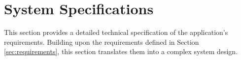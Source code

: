 \section{System Specifications}

This section provides a detailed technical specification of the application's requirements. Building upon the requirements defined in Section \ref{sec:requirements}, this section translates them into a complex system design. 




